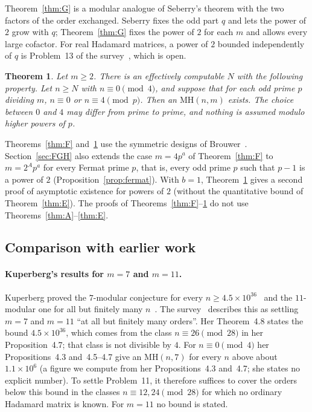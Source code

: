 \documentclass[10pt]{article}
\newtheorem{theorem}{Theorem}
\theoremstyle{remark}
\newcommand{\MH}{\mathrm{MH}}
\begin{document}
Theorem~\ref{thm:G} is a modular analogue of Seberry's theorem with the two factors of the order exchanged. Seberry fixes the odd part $q$ and lets the power of $2$ grow with $q$; Theorem~\ref{thm:G} fixes the power of $2$ for each $m$ and allows every large cofactor. For real Hadamard matrices, a power of $2$ bounded independently of $q$ is Problem~13 of the survey~\cite[\S5.5]{EKLO}, which is open.

\begin{theorem}\label{thm:H}
Let $m\ge2$. There is an effectively computable $N$ with the following property. Let $n\ge N$ with $n\equiv0\pmod4$, and suppose that for each odd prime $p$ dividing $m$, $n\equiv0$ or $n\equiv4\pmod p$. Then an $\MH(n,m)$ exists. The choice between $0$ and $4$ may differ from prime to prime, and nothing is assumed modulo higher powers of $p$.
\end{theorem}

Theorems~\ref{thm:F} and~\ref{thm:H} use the symmetric designs of Brouwer~\cite{Br83}. Section~\ref{sec:FGH} also extends the case $m=4p^a$ of Theorem~\ref{thm:F} to $m=2^Ap^a$ for every Fermat prime $p$, that is, every odd prime $p$ such that $p-1$ is a power of $2$ (Proposition~\ref{prop:fermat}). With $b=1$, Theorem~\ref{thm:H} gives a second proof of asymptotic existence for powers of $2$ (without the quantitative bound of Theorem~\ref{thm:E}). The proofs of Theorems~\ref{thm:F}--\ref{thm:H} do not use Theorems~\ref{thm:A}--\ref{thm:E}.

\subsection{Comparison with earlier work}\label{sec:compare}
\paragraph{Kuperberg's results for $m=7$ and $m=11$.}
Kuperberg proved the $7$-modular conjecture for every $n\ge4.5\times10^{36}$~\cite[Theorem~4.8]{K} and the $11$-modular one for all but finitely many $n$~\cite[Corollary~5.5]{K}. The survey~\cite[\S5.4]{EKLO} describes this as settling $m=7$ and $m=11$ ``at all but finitely many orders''. Her Theorem~4.8 states the bound $4.5\times10^{36}$, which comes from the class $n\equiv26\pmod{28}$ in her Proposition~4.7; that class is not divisible by $4$. For $n\equiv0\pmod4$ her Propositions~4.3 and~4.5--4.7 give an $\MH(n,7)$ for every $n$ above about $1.1\times10^{6}$ (a figure we compute from her Propositions~4.3 and~4.7; she states no explicit number). To settle Problem~11, it therefore suffices to cover the orders below this bound in the classes $n\equiv12,24\pmod{28}$ for which no ordinary Hadamard matrix is known. For $m=11$ no bound is stated.
\end{document}
